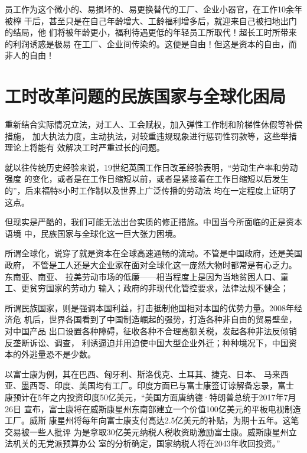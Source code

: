 

员工作为这个微小的、易损坏的、易更换替代的工厂、企业小器官，在工作10余年被榨
干后，甚至只是在自己年龄增大、工龄福利增多后，就迎来自己被扫地出门的结局，他
们将被年龄更小，福利待遇更低的年轻员工所取代！超长工时所带来的利润诱惑是极易
在工厂、企业间传染的。这便是自由！但这是资本的自由，而非人的自由！

\section{工时改革问题的民族国家与全球化困局}

重新结合实际情况立法，对工人、工会赋权，加入弹性工作制和阶梯性休假等补偿措施，
加大执法力度，主动执法，对较重违规现象进行惩罚性罚款等，这些举措理论上将能有
效解决工时严重过长的问题。

就以往传统历史经验来说，19世纪英国工作日改革经验表明，“劳动生产率和劳动强度
的变化，或者是在工作日缩短以前，或者是紧接着在工作日缩短以后发生
的”，后来福特8小时工作制以及世界上广泛传播的劳动法
均在一定程度上证明了这点。

但现实是严酷的，我们可能无法出台实质的修正措施。中国当今所面临的正是资本语境
中，民族国家与全球化这一巨大张力困境。

所谓全球化，说穿了就是资本在全球高速通畅的流动。不管是中国政府，还是美国政府，
不管是工人还是大企业家在面对全球化这一庞然大物时都常是有心乏力。东南亚、南亚、
拉美劳动市场的低廉——相当程度上是因为当地贫困人口、童工、更贫穷国家的劳动力
输入；政府的非现代化管控要求，法律法规不健全；

所谓民族国家，则是强调本国利益，打击抵制他国相对本国的优势力量。2008年经济危
机后，世界各国看到了中国制造崛起的强势，打造各种非自由的贸易壁垒，对中国产品
出口设置各种障碍，征收各种不合理高额关税，发起各种非法反倾销反垄断诉讼、调查，
利诱逼迫并用迫使中国大型企业外迁；种种境况下，中国资本的外逃量恐不是少数。


以富士康\cite{foxconnwiki}为例，其在巴西、匈牙利、斯洛伐克、土耳其、捷克、日本、
马来西亚、墨西哥、印度、美国均有工厂。印度方面已与富士康签订谅解备忘录，富士
康预计在5年之内投资印度50亿美元，“美国方面唐纳德·特朗普总统于2017年7月26日
宣布，富士康将在威斯康星州东南部建立一个价值100亿美元的平板电视制造工厂。威斯
康星州将每年向富士康支付高达2.5亿美元的补贴，为期十五年。这笔交易被一些人批评
为是拿取30亿美元纳税人税收资助激励富士康。威斯康星州立法机关的无党派预算办公
室的分析确定，国家纳税人将在2043年收回投资。”


